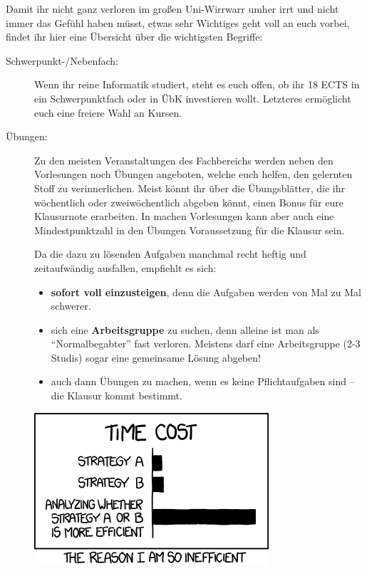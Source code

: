 Damit ihr nicht ganz verloren im gro\ss en Uni-Wirrwarr umher irrt und
  nicht immer das Gefühl haben müsst, etwas sehr Wichtiges geht
  voll an euch vorbei, findet ihr hier eine Übersicht über die wichtigsten Begriffe:

\begin{description}


\item [Schwerpunkt-/Nebenfach:] Wenn ihr reine Informatik studiert, steht es
  euch offen, ob ihr 18 ECTS in ein Schwerpunktfach oder in ÜbK
  investieren wollt. Letzteres ermöglicht euch eine freiere Wahl an Kursen.

\item [Übungen:] Zu den meisten Veranstaltungen des Fachbereichs werden neben den Vorlesungen noch Übungen angeboten, welche euch helfen, den gelernten Stoff zu verinnerlichen. Meist könnt ihr über die Übungsblätter, die ihr wöchentlich oder zweiwöchentlich abgeben könnt, einen Bonus für eure Klausurnote erarbeiten. In machen Vorlesungen kann aber auch eine Mindestpunktzahl in den Übungen Voraussetzung für die Klausur sein.

Da die dazu zu lösenden Aufgaben manchmal recht heftig und zeitaufwändig ausfallen, empfiehlt es sich:

\begin{itemize}

\item \textbf{sofort voll einzusteigen}, denn die Aufgaben werden von Mal
  zu Mal schwerer.

\item sich eine \textbf{Arbeitsgruppe} zu suchen, denn alleine ist man
  als "`Normalbegabter"' fast verloren. Meistens darf eine
  Arbeitsgruppe (2-3 Studis) sogar eine gemeinsame Lösung abgeben!

\item auch dann Übungen zu machen, wenn es keine Pflichtaufgaben sind --
  die Klausur kommt bestimmt.

\end {itemize}

\begin{center}
\includegraphics[width=0.5\hsize]{info/xkcd/efficiency.png}
\end{center}



\end{description}

